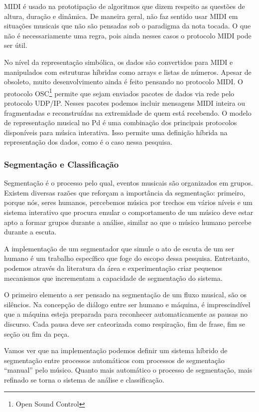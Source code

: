\documentclass{ppgmus}
\begin{document}
MIDI é usado na prototipação de algoritmos que dizem respeito as questões de 
altura, duração e dinâmica. De maneira geral, não faz sentido usar MIDI em situações 
musicais que não são pensadas sob o paradigma da nota tocada. O que não é
necessariamente uma regra, pois ainda nesses casos o protocolo MIDI pode ser
útil.

No nível da representação simbólica, os dados são convertidos para MIDI e manipulados
com estruturas híbridas como arrays e listas de números. Apesar de obsoleto, muito desenvolvimento
ainda é feito pensando no protocolo MIDI. O protocolo OSC\footnote{Open Sound Control} permite que
sejam enviados pacotes de dados via rede pelo protocolo UDP/IP. Nesses pacotes podemos incluir
mensagens MIDI inteira ou fragmentadas e reconstruídas na extremidade de quem está recebendo.
O modelo de representação musical no Pd é uma combinação dos principais protocolos disponíveis para
música interativa. Isso permite uma definição híbrida na representação dos dados, como é o caso
nessa pesquisa.


\subsubsection{Segmentação e Classificação}


Segmentação é o processo pelo qual, eventos musicais são organizados
em grupos. Existem diversas razões que reforçam a importância da 
segmentação: primeiro, porque nós, seres humanos, percebemos música
por trechos em vários níveis e um sistema interativo que procura emular
o comportamento de um músico deve estar apto a formar grupos durante
a análise, similar ao que o músico humano percebe durante a escuta.

A implementação de um segmentador que simule o ato de escuta de um ser 
humano é um trabalho específico que foge do escopo dessa pesquisa. Entretanto,
podemos através da literatura da área e experimentação criar pequenos
mecanismos que incrementam a capacidade de segmentação do sistema.

O primeiro elemento a ser pensado na segmentação de um fluxo musical,
são os silêncios. Na concepção de diálogo entre ser humano e máquina,
é imprescindível que a máquina esteja preparada para reconhecer automaticamente
as pausas no discurso. Cada pausa deve ser cateorizada como respiração, fim de frase,
fim se seção ou fim da peça.

Vamos ver que na implementação podemos definir um sistema híbrido de segmentação
entre processos automáticos com processos de segmentação ``manual'' pelo músico.
Quanto mais automático o processo de segmentação, mais refinado se torna
o sistema de análise e classificação. 
\end{document}
